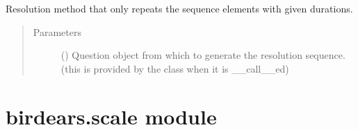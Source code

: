 \documentclass[letterpaper,10pt,english]{sphinxmanual}
\begin{document}

\begin{fulllineitems}
\label{\detokenize{birdears:birdears.resolution.repeat_only}}
\sphinxAtStartPar
Resolution method that only repeats the sequence elements with given
durations.
\begin{quote}\begin{description}
\item[{Parameters}] \leavevmode
\sphinxAtStartPar
{} () \textendash{} Question object from which to generate the
resolution sequence. (this is provided by the  class
when it is {\color{red}\bfseries{}\textasciigrave{}}\_\_call\_\_\textasciigrave{}ed)

\end{description}\end{quote}

\end{fulllineitems}



\section{birdears.scale module}
\label{\detokenize{birdears:module-birdears.scale}}\label{\detokenize{birdears:birdears-scale-module}}
\end{document}
